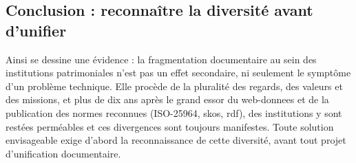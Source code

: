 \subsection{Conclusion : reconnaître la diversité avant d'unifier}

Ainsi se dessine une évidence : la fragmentation documentaire au sein des institutions patrimoniales n’est pas un effet secondaire, ni seulement le symptôme d’un problème technique. Elle procède de la pluralité des regards, des valeurs et des missions, et plus de dix ans après le grand essor du \gls{web-donnees} et de la publication des normes reconnues (ISO-25964, \ac{skos}, \ac{rdf}), des institutions y sont restées perméables et ces divergences sont toujours manifestes. Toute solution envisageable exige d’abord la reconnaissance de cette diversité, avant tout projet d’unification documentaire.